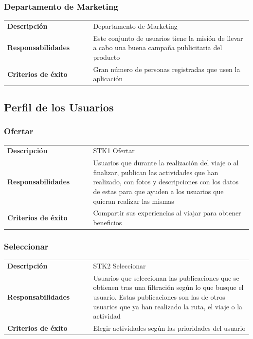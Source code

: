 \documentclass[11pt]{article}
\begin{document}
\subsubsection{Departamento de Marketing}
\begin{table}[H]
  \centering
  \begin{tabular}{p{0.35\linewidth}|p{0.65\linewidth}}
    \toprule
    \textbf{Descripción} & Departamento de Marketing\\ 
    \textbf{Responsabilidades} & Este conjunto de usuarios tiene la misión de llevar a cabo una buena campaña publicitaria del producto \\
    \textbf{Criterios de éxito} & Gran número de personas registradas que usen la aplicación\\
    \bottomrule
  \end{tabular}
\end{table}


\subsection{Perfil de los Usuarios}
\subsubsection{Ofertar}
\begin{table}[H]
  \centering
  \begin{tabular}{p{0.35\linewidth}|p{0.65\linewidth}}
    \toprule
    \textbf{Descripción} & STK1 Ofertar\\
    \textbf{Responsabilidades} & Usuarios que durante la realización del viaje o al finalizar, publican las actividades que han realizado, con fotos y descripciones con los datos de estas para que ayuden a los usuarios que quieran realizar las mismas\\
    \textbf{Criterios de éxito} &  Compartir sus experiencias al viajar para obtener beneficios\\
    \bottomrule
  \end{tabular}
\end{table}

\subsubsection{Seleccionar}
\begin{table}[H]
  \centering
  \begin{tabular}{p{0.35\linewidth}|p{0.65\linewidth}}
    \toprule
    \textbf{Descripción} & STK2 Seleccionar\\
    \textbf{Responsabilidades} & Usuarios que seleccionan las publicaciones que se obtienen tras una filtración según lo que busque el usuario. Estas publicaciones son las de otros usuarios que ya han realizado la ruta, el viaje o la actividad\\
    \textbf{Criterios de éxito} &  Elegir actividades según las prioridades del usuario\\
    \bottomrule
  \end{tabular}
\end{table}
\end{document}
